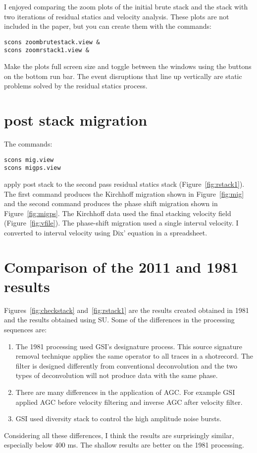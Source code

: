 I enjoyed comparing the zoom plots of the initial brute stack and the stack 
with two iterations of residual statics and velocity analysis.  These plots
are not included in the paper, but you can create them with the
commands:
\begin{verbatim}
scons zoombrutestack.view & 
scons zoomrstack1.view & 
\end{verbatim}
Make the plots full screen size and toggle between the windows using the 
buttons on the bottom run bar.  The event disruptions that line up vertically
are static problems solved by the residual statics process.
  

\section{post stack migration}
The commands:
\begin{verbatim}
scons mig.view
scons migps.view
\end{verbatim}
apply post stack to the second pass residual statics stack
(Figure~\ref{fig:rstack1}). The first command produces the Kirchhoff
migration shown in Figure~\ref{fig:mig} and the second command
produces the phase shift migration shown in Figure~\ref{fig:migps}.
The Kirchhoff data used the final stacking velocity field
(Figure~\ref{fig:vfile}).  The phase-shift migration used a single
interval velocity.  I converted to interval velocity using Dix'
equation \cite[]{GEO20-01-00680086} in a spreadsheet.


\section{Comparison of the 2011 and 1981 results}
Figures~\ref{fig:checkstack} and~\ref{fig:rstack1} are the results created 
obtained in 1981 and the results obtained using SU.  Some of the differences 
in the processing sequences are:
\begin{enumerate}
\item The 1981 processing used GSI's designature process.  This source 
signature removal technique applies the same operator to all traces in a 
shotrecord.  The filter is designed differently from conventional 
deconvolution and the two types of deconvolution will not produce data 
with the same phase. 
\item There are many differences in the application of AGC.  For example 
GSI applied AGC before velocity filtering and inverse AGC after velocity 
filter.
\item GSI used diversity stack to control the high amplitude noise bursts.
\end{enumerate}
Considering all these differences, I think the results are surprisingly 
similar, especially below 400 ms.  The shallow results are better on the 
1981 processing.

